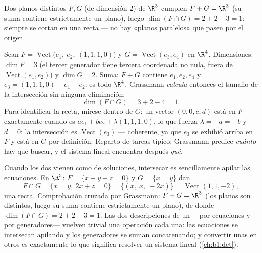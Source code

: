 \begin{example}\label{ex:b1:findim:planes}
Dos planos distintos $F, G$ (de dimensión $2$) de $\R^3$ cumplen
$F + G = \R^3$ (su suma contiene estrictamente un plano), luego
$\dim(F \cap G) = 2 + 2 - 3 = 1$: siempre se cortan en una recta ---
no hay «planos paralelos» que pasen por el origen.
\end{example}

\begin{example}
\label{ex:b1:findim:grassmannrun}
Sean $F = \operatorname{Vect}\bigl(e_1,\ e_2,\ (1,1,1,0)\bigr)$ y
$G = \operatorname{Vect}(e_3, e_4)$ en $\R^4$. Dimensiones:
$\dim F = 3$ (el tercer generador tiene tercera coordenada no nula,
fuera de $\operatorname{Vect}(e_1, e_2)$) y $\dim G = 2$. Suma:
$F + G$ contiene $e_1, e_2, e_4$ y $e_3 = (1,1,1,0) - e_1 - e_2$: es
todo $\R^4$. Grassmann \emph{calcula} entonces el tamaño de la
intersección sin ninguna eliminación:
\[
\dim(F \cap G) = 3 + 2 - 4 = 1 .
\]
Para identificar la recta, mírese dentro de $G$: un vector
$(0, 0, c, d)$ está en $F$ exactamente cuando es
$a e_1 + b e_2 + \lambda(1,1,1,0)$, lo que fuerza
$\lambda = -a = -b$ y $d = 0$: la intersección es
$\operatorname{Vect}(e_3)$ --- coherente, ya que $e_3$ se exhibió
arriba en $F$ y está en $G$ por definición. Reparto de tareas típico:
Grassmann predice \emph{cuánto} hay que buscar, y el sistema lineal
encuentra después \emph{qué}.
\end{example}

\begin{example}
\label{ex:b1:findim:intersectequations}
Cuando los dos  vienen como  de soluciones,
intersecar es sencillamente apilar las ecuaciones. En $\R^3$:
$F = \{x + y + z = 0\}$ y $G = \{x = y\}$ dan
\[
F \cap G = \{x = y,\ 2x + z = 0\}
= \{(x,\ x,\ -2x)\} = \operatorname{Vect}(1, 1, -2),
\]
una recta. Comprobación cruzada por Grassmann: $F + G = \R^3$ (los
planos son distintos, luego su suma contiene estrictamente un plano),
de donde $\dim(F\cap G) = 2 + 2 - 3 = 1$. Las dos descripciones de un
 ---por ecuaciones y por generadores--- vuelven trivial
una operación cada una: las ecuaciones se intersecan apilando y los
generadores se suman concatenando; y convertir unas en otros es
exactamente lo que significa resolver un sistema lineal
(\cref{ch:b1:det}).
\end{example}


